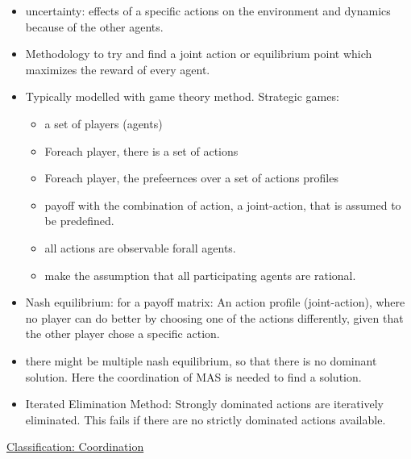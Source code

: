 \begin{itemize}[noitemsep,nolistsep]
	\item uncertainty: effects of a specific actions on the environment and dynamics because of the other agents.
	\item Methodology to try and find a joint action or equilibrium point which maximizes the reward of every agent.
	\item Typically modelled with game theory method. Strategic games:
	\begin{itemize}[noitemsep,nolistsep]
		\item a set of players (agents)
		\item Foreach player, there is a set of actions
		\item Foreach player, the prefeernces over a set of actions profiles
		\item payoff with the combination of action, a joint-action, that is assumed to be predefined.
		\item all actions are observable forall agents.
		\item make the assumption that all participating agents are rational.
	\end{itemize}
	\item Nash equilibrium: for a payoff matrix: An action profile (joint-action), where no player can do better by choosing one of the actions differently, given that the other player chose a specific action.
	\item there might be multiple nash equilibrium, so that there is no dominant solution. Here the coordination of MAS is needed to find a solution.
	\item Iterated Elimination Method: Strongly dominated actions are iteratively eliminated. This fails if there are no strictly dominated actions available.
\end{itemize}
\underline{Classification: Coordination}
